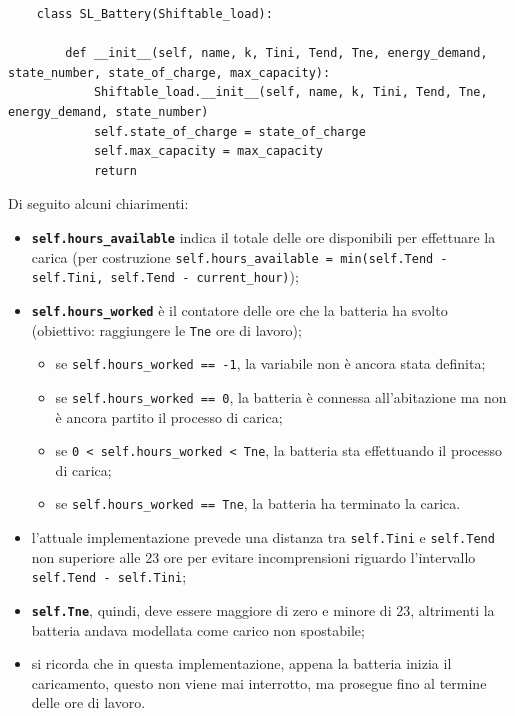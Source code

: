\documentclass[italian, Lau, oneside]{sapthesis}
\begin{document}
\begin{verbatim}
    class SL_Battery(Shiftable_load):
    
        def __init__(self, name, k, Tini, Tend, Tne, energy_demand, state_number, state_of_charge, max_capacity): 
            Shiftable_load.__init__(self, name, k, Tini, Tend, Tne, energy_demand, state_number)
            self.state_of_charge = state_of_charge
            self.max_capacity = max_capacity
            return
\end{verbatim}

Di seguito alcuni chiarimenti: 
\begin{itemize}

    \item \textbf{\texttt{self.hours\_available}} indica il totale delle ore disponibili per effettuare la carica (per costruzione \texttt{self.hours\_available = min(self.Tend - self.Tini, self.Tend - current\_hour)});
    \item \textbf{\texttt{self.hours\_worked}} è il contatore delle ore che la batteria ha svolto (obiettivo: raggiungere le \texttt{Tne} ore di lavoro);
    \begin{itemize}
        \item se \texttt{self.hours\_worked == -1}, la variabile non è ancora stata definita;
        \item se \texttt{self.hours\_worked == 0}, la batteria è connessa all'abitazione ma non è ancora partito il processo di carica;
        \item se \texttt{0 < self.hours\_worked < Tne}, la batteria sta effettuando il processo di carica;
        \item se \texttt{self.hours\_worked == Tne}, la batteria ha terminato la carica.
    \end{itemize}
    \item l'attuale implementazione prevede una distanza tra \texttt{self.Tini} e \texttt{self.Tend} non superiore alle 23 ore per evitare incomprensioni riguardo l'intervallo \texttt{self.Tend - self.Tini};
    \item \textbf{\texttt{self.Tne}}, quindi, deve essere maggiore di zero e minore di 23, altrimenti la batteria andava modellata come carico non spostabile;
    \item si ricorda che in questa implementazione, appena la batteria inizia il caricamento, questo non viene mai interrotto, ma prosegue fino al termine delle ore di lavoro.
\end{itemize}
\end{document}

